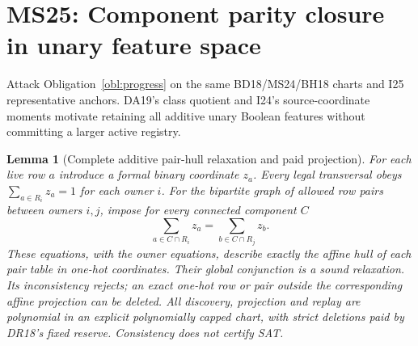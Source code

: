 \documentclass[11pt]{article}
\newtheorem{lemma}[theorem]{Lemma}
\begin{document}
\section{MS25: Component parity closure in unary feature space}\label{sec:ms25}
Attack Obligation~\ref{obl:progress} on the same BD18/MS24/BH18 charts and I25 representative anchors. DA19's class quotient and I24's source-coordinate moments motivate retaining all additive unary Boolean features without committing a larger active registry.
\begin{lemma}[Complete additive pair-hull relaxation and paid projection]\label{lem:ms25-component}
For each live row $a$ introduce a formal binary coordinate $z_a$. Every legal transversal obeys $\sum_{a\in R_i}z_a=1$ for each owner $i$. For the bipartite graph of allowed row pairs between owners $i,j$, impose for every connected component $C$
\[
\sum_{a\in C\cap R_i}z_a=\sum_{b\in C\cap R_j}z_b .
\]
These equations, with the owner equations, describe exactly the affine hull of each pair table in one-hot coordinates. Their global conjunction is a sound relaxation. Its inconsistency rejects; an exact one-hot row or pair outside the corresponding affine projection can be deleted. All discovery, projection and replay are polynomial in an explicit polynomially capped chart, with strict deletions paid by DR18's fixed reserve. Consistency does not certify SAT.
\end{lemma}
\end{document}
